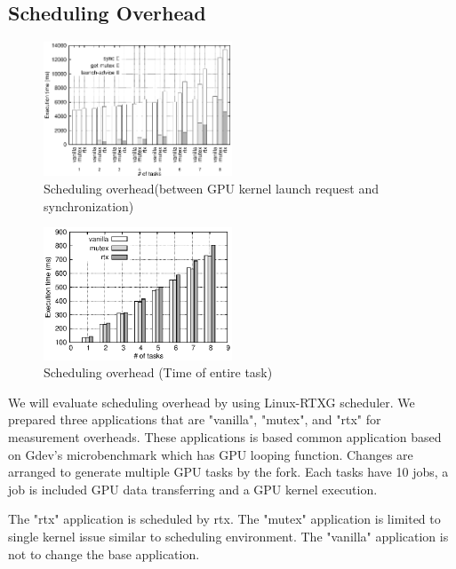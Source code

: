 \subsection{Scheduling Overhead}\label{sec:eval:sched_overhead}

\begin{figure}[t]
\begin{center}
\includegraphics[width=0.5\textwidth]{img/sum_task_fp.eps}
\caption{Scheduling overhead(between GPU kernel launch request and synchronization)}
\end{center}
\label{fig:fp_overhead}
\end{figure}

\begin{figure}[t]
\begin{center}
\includegraphics[width=0.5\textwidth]{img/sum_task.eps}
\caption{Scheduling overhead (Time of entire task)}
\end{center}
\label{fig:fp_overhead}
\end{figure}

We will evaluate scheduling overhead by using Linux-RTXG scheduler.
We prepared three applications that are "vanilla", "mutex", and "rtx" for measurement overheads.
These applications is based common application based on Gdev's microbenchmark which has GPU looping function.
Changes are arranged to generate multiple GPU tasks by the fork.
Each tasks have 10 jobs, a job is included GPU data transferring and a GPU kernel execution.

The "rtx" application is scheduled by rtx.
The "mutex" application  is limited to single kernel issue similar to scheduling environment.
The "vanilla" application is not to change the base application.

